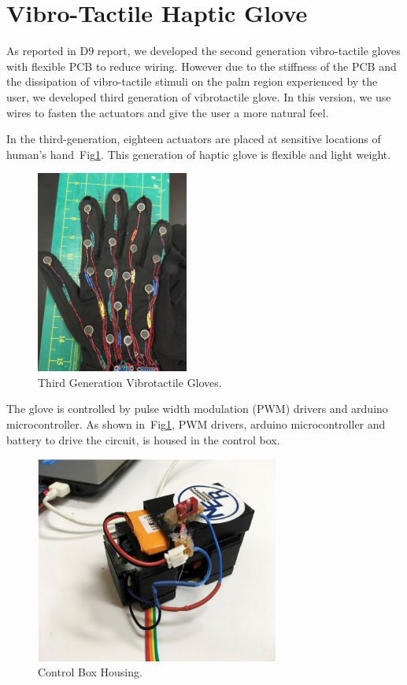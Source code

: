 \section{Vibro-Tactile Haptic Glove}

As reported in D9 report, we developed the second generation
vibro-tactile gloves with flexible PCB to reduce wiring. However due
to the stiffness of the PCB and the dissipation of vibro-tactile
stimuli on the palm region experienced by the user, we developed third
generation of vibrotactile glove. In this version, we use wires to
fasten the actuators and give the user a more natural feel.

In the third-generation, eighteen actuators are placed at sensitive
locations of human’s hand~Fig\ref{fig:glove}. This generation of haptic glove is flexible
and light weight.

\begin{figure}[!ht]
  \centering
  \includegraphics[width=5cm]{figures/figure1.jpg}
  \caption{Third Generation Vibrotactile Gloves.}
  \label{fig:glove}
\end{figure}

The glove is controlled by pulse width modulation (PWM) drivers and arduino microcontroller. As shown in~Fig\ref{fig:glove}, PWM drivers, arduino microcontroller and battery to drive the circuit, is housed in the control box.

\begin{figure}[!ht]
  \centering
  \includegraphics[width=8cm]{figures/figure2.jpg}
  \caption{Control Box Housing.}
  \label{fig:box}
\end{figure}


